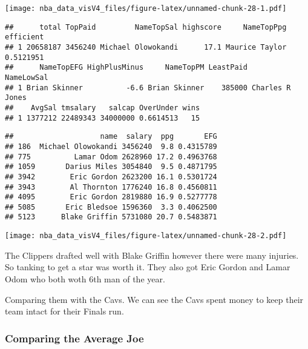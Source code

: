 \documentclass[]{article}
\begin{document}
\texttt{[image: nba\_data\_visV4\_files/figure-latex/unnamed-chunk-28-1.pdf]}

\begin{verbatim}
##      total TopPaid         NameTopSal highscore     NameTopPpg efficient
## 1 20658187 3456240 Michael Olowokandi      17.1 Maurice Taylor 0.5121951
##      NameTopEFG HighPlusMinus     NameTopPM LeastPaid      NameLowSal
## 1 Brian Skinner          -6.6 Brian Skinner    385000 Charles R Jones
##    AvgSal tmsalary   salcap OverUnder wins
## 1 1377212 22489343 34000000 0.6614513   15
\end{verbatim}

\begin{verbatim}
##                    name  salary  ppg       EFG
## 186  Michael Olowokandi 3456240  9.8 0.4315789
## 775          Lamar Odom 2628960 17.2 0.4963768
## 1059       Darius Miles 3054840  9.5 0.4871795
## 3942        Eric Gordon 2623200 16.1 0.5301724
## 3943        Al Thornton 1776240 16.8 0.4560811
## 4095        Eric Gordon 2819880 16.9 0.5277778
## 5085       Eric Bledsoe 1596360  3.3 0.4062500
## 5123      Blake Griffin 5731080 20.7 0.5483871
\end{verbatim}

\texttt{[image: nba\_data\_visV4\_files/figure-latex/unnamed-chunk-28-2.pdf]}

The Clippers drafted well with Blake Griffin however there were many
injuries. So tanking to get a star was worth it. They also got Eric
Gordon and Lamar Odom who both woth 6th man of the year.

Comparing them with the Cavs. We can see the Cavs spent money to keep
their team intact for their Finals run.

\subsubsection{Comparing the Average
Joe}\label{comparing-the-average-joe}
\end{document}
